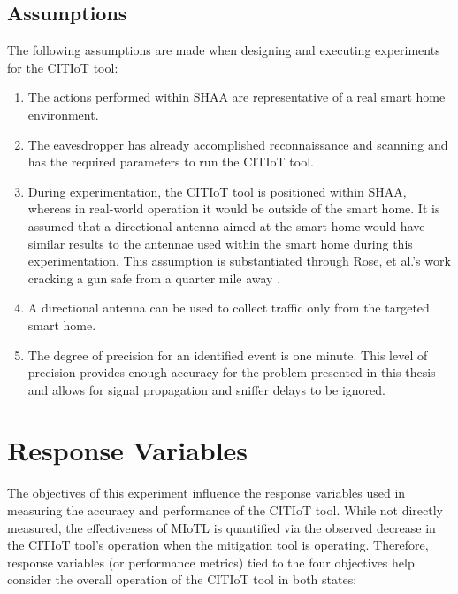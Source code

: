 \documentclass[12pt,letterpaper,oneside]{book}
\begin{document}
		\figSutCutDiagram
		
			\subsection{Assumptions}
			The following assumptions are made when designing and executing experiments for the \ac{CITIoT} tool:
			\begin{enumerate}
				\item The actions performed within \ac{SHAA} are representative of a real smart home environment.
				\item The eavesdropper has already accomplished reconnaissance and scanning and has the required parameters to run the \ac{CITIoT} tool.
				\item During experimentation, the \ac{CITIoT} tool is positioned within \ac{SHAA}, whereas in real-world operation it would be outside of the smart home. It is assumed that a directional antenna aimed at the smart home would have similar results to the antennae used within the smart home during this experimentation. This assumption is substantiated through Rose, et al.'s work cracking a gun safe from a quarter mile away \cite{RoseLocks}.
				\item A directional antenna can be used to collect traffic only from the targeted smart home.
				\item The degree of precision for an identified event is one minute. This level of precision provides enough accuracy for the problem presented in this thesis and allows for signal propagation and sniffer delays to be ignored.
			\end{enumerate}
			
		\section{Response Variables} \label{responseVariables}
		
		The objectives of this experiment influence the response variables used in measuring the accuracy and performance of the \ac{CITIoT} tool. While not directly measured, the effectiveness of \ac{MIoTL} is quantified via the observed decrease in the \ac{CITIoT} tool's operation when the mitigation tool is operating. Therefore, response variables (or performance metrics) tied to the four objectives help consider the overall operation of the \ac{CITIoT} tool in both states:
		
\end{document}
